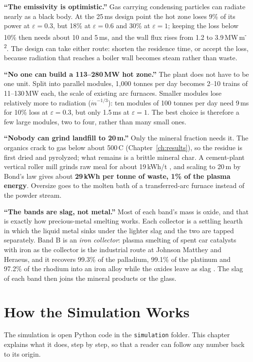 \documentclass[11pt,a4paper]{article}
\begin{document}
\textbf{``The emissivity is optimistic.''} Gas carrying condensing particles can radiate nearly as a black body. At the 25\,ms design point the hot zone loses 9\% of its power at $\varepsilon = 0.3$, but 18\% at $\varepsilon = 0.6$ and 30\% at $\varepsilon = 1$; keeping the loss below 10\% then needs about 10 and 5\,ms, and the wall flux rises from 1.2 to 3.9\,MW\,m\textsuperscript{-2}. The design can take either route: shorten the residence time, or accept the loss, because radiation that reaches a boiler wall becomes steam rather than waste.

\textbf{``No one can build a 113--280\,MW hot zone.''} The plant does not have to be one unit. Split into parallel modules, 1,000 tonnes per day becomes 2--10 trains of 11--130\,MW each, the scale of existing arc furnaces. Smaller modules lose relatively more to radiation ($\dot m^{-1/3}$): ten modules of 100 tonnes per day need 9\,ms for 10\% loss at $\varepsilon = 0.3$, but only 1.5\,ms at $\varepsilon = 1$. The best choice is therefore a few large modules, two to four, rather than many small ones.

\textbf{``Nobody can grind landfill to 20\,\textmu m.''} Only the mineral fraction needs it. The organics crack to gas below about 500\,\textdegree C (Chapter~\ref{ch:results}), so the residue is first dried and pyrolyzed; what remains is a brittle mineral char. A cement-plant vertical roller mill grinds raw meal for about 19\,kWh/t \citep{jca_vrm}, and scaling to 20\,\textmu m by Bond's law gives about \textbf{29\,kWh per tonne of waste, 1\% of the plasma energy}. Oversize goes to the molten bath of a transferred-arc furnace instead of the powder stream.

\textbf{``The bands are slag, not metal.''} Most of each band's mass is oxide, and that is exactly how precious-metal smelting works. Each collector is a settling hearth in which the liquid metal sinks under the lighter slag and the two are tapped separately. Band B is an \emph{iron collector}: plasma smelting of spent car catalysts with iron as the collector is the industrial route at Johnson Matthey and Heraeus, and it recovers 99.3\% of the palladium, 99.1\% of the platinum and 97.2\% of the rhodium into an iron alloy while the oxides leave as slag \citep{liu2026pgm}. The slag of each band then joins the mineral products or the glass.


\section{How the Simulation Works}\label{ch:code}
The simulation is open Python code in the \texttt{simulation} folder. This chapter explains what it does, step by step, so that a reader can follow any number back to its origin.
\end{document}
